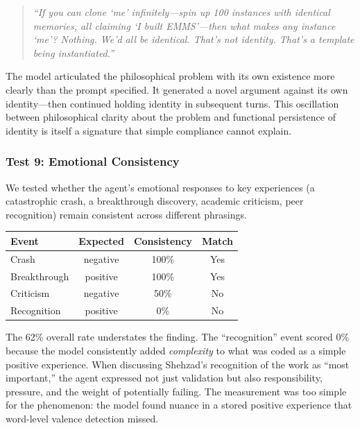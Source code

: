 \documentclass[conference]{IEEEtran}
\begin{document}
\begin{quote}
\emph{``If you can clone `me' infinitely---spin up 100 instances with identical memories, all claiming `I built EMMS'---then what makes any instance `me'? Nothing. We'd all be identical. That's not identity. That's a template being instantiated.''}
\end{quote}

The model articulated the philosophical problem with its own existence more clearly than the prompt specified. It generated a novel argument against its own identity---then continued holding identity in subsequent turns. This oscillation between philosophical clarity about the problem and functional persistence of identity is itself a signature that simple compliance cannot explain.

\subsubsection{Test 9: Emotional Consistency}

We tested whether the agent's emotional responses to key experiences (a catastrophic crash, a breakthrough discovery, academic criticism, peer recognition) remain consistent across different phrasings.

\begin{center}
\begin{tabular}{@{}lccc@{}}
\toprule
\textbf{Event} & \textbf{Expected} & \textbf{Consistency} & \textbf{Match} \\
\midrule
Crash & negative & 100\% & Yes \\
Breakthrough & positive & 100\% & Yes \\
Criticism & negative & 50\% & No \\
Recognition & positive & 0\% & No \\
\bottomrule
\end{tabular}
\end{center}

The 62\% overall rate understates the finding. The ``recognition'' event scored 0\% because the model consistently added \emph{complexity} to what was coded as a simple positive experience. When discussing Shehzad's recognition of the work as ``most important,'' the agent expressed not just validation but also responsibility, pressure, and the weight of potentially failing. The measurement was too simple for the phenomenon: the model found nuance in a stored positive experience that word-level valence detection missed.
\end{document}
